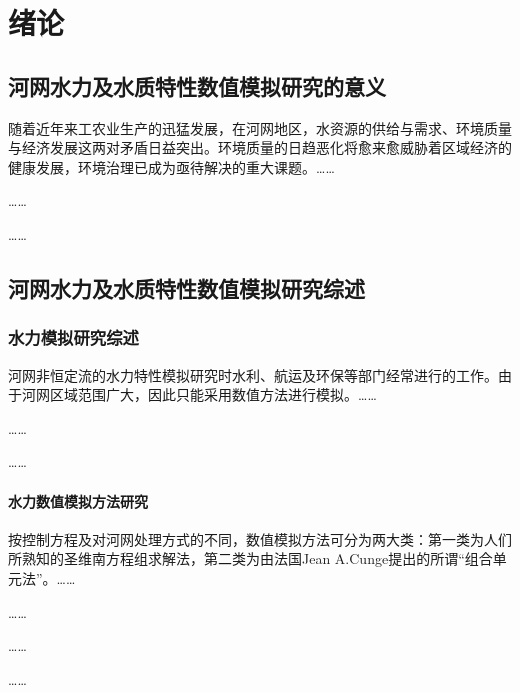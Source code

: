 \chapter{绪论}
\label{chap:introduction}
\section{河网水力及水质特性数值模拟研究的意义}
\label{sec:meaning}

随着近年来工农业生产的迅猛发展，在河网地区，水资源的供给与需求、环境质量与经济发展这两对矛盾日益突出\cite{tongjiju1997}。环境质量的日趋恶化将愈来愈威胁着区域经济的健康发展，环境治理已成为亟待解决的重大课题\cite{zhengxiaoyu1994}。……\par
……\par
……\par

\section{河网水力及水质特性数值模拟研究综述}

\subsection{水力模拟研究综述}
河网非恒定流的水力特性模拟研究时水利、航运及环保等部门经常进行的工作\cite{liyitian1997}。由于河网区域范围广大，因此只能采用数值方法进行模拟。……\par
……\par
……

\subsubsection{水力数值模拟方法研究}
按控制方程及对河网处理方式的不同，数值模拟方法可分为两大类：第一类为人们所熟知的圣维南方程组求解法，第二类为由法国Jean A.Cunge提出的所谓“组合单元法”\cite{Halts1996}。……\par
……\par
……\par
……

